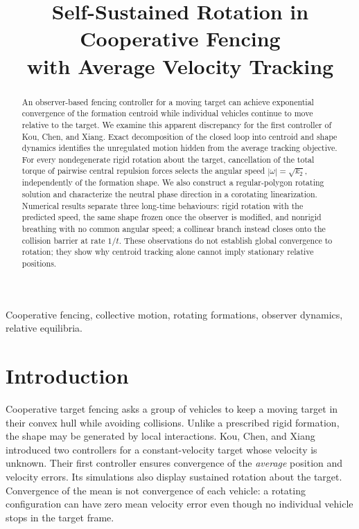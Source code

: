 \documentclass[conference]{IEEEtran}
\title{Self-Sustained Rotation in Cooperative Fencing\\with Average Velocity Tracking}
\author{\IEEEauthorblockN{Author Name(s)}
\IEEEauthorblockA{Affiliation and e-mail to be supplied before submission}}
\begin{document}
\maketitle
\begin{abstract}
An observer-based fencing controller for a moving target can achieve exponential convergence of the formation centroid while individual vehicles continue to move relative to the target. We examine this apparent discrepancy for the first controller of Kou, Chen, and Xiang. Exact decomposition of the closed loop into centroid and shape dynamics identifies the unregulated motion hidden from the average tracking objective. For every nondegenerate rigid rotation about the target, cancellation of the total torque of pairwise central repulsion forces selects the angular speed $|\omega|=\sqrt{k_2}$, independently of the formation shape. We also construct a regular-polygon rotating solution and characterize the neutral phase direction in a corotating linearization. Numerical results separate three long-time behaviours: rigid rotation with the predicted speed, the same shape frozen once the observer is modified, and nonrigid breathing with no common angular speed; a collinear branch instead closes onto the collision barrier at rate $1/t$. These observations do not establish global convergence to rotation; they show why centroid tracking alone cannot imply stationary relative positions.
\end{abstract}
\begin{IEEEkeywords}
Cooperative fencing, collective motion, rotating formations, observer dynamics, relative equilibria.
\end{IEEEkeywords}

\section{Introduction}
\label{sec:intro}
Cooperative target fencing asks a group of vehicles to keep a moving target in their convex hull while avoiding collisions. Unlike a prescribed rigid formation, the shape may be generated by local interactions. Kou, Chen, and Xiang~\cite{kou2022} introduced two controllers for a constant-velocity target whose velocity is unknown. Their first controller ensures convergence of the \emph{average} position and velocity errors. Its simulations also display sustained rotation about the target. Convergence of the mean is not convergence of each vehicle: a rotating configuration can have zero mean velocity error even though no individual vehicle stops in the target frame.
\end{document}
